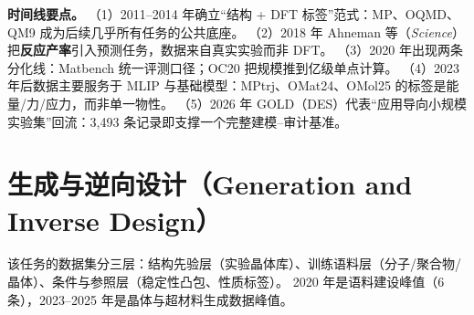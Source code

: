\documentclass[11pt,a4paper]{ctexart}
\begin{document}
\textbf{时间线要点。}
（1）2011--2014 年确立``结构 + DFT 标签''范式：MP、OQMD、QM9 成为后续几乎所有任务的公共底座。
（2）2018 年 Ahneman 等（\textit{Science}）把\textbf{反应产率}引入预测任务，数据来自真实实验而非 DFT。
（3）2020 年出现两条分化线：Matbench 统一评测口径；OC20 把规模推到亿级单点计算。
（4）2023 年后数据主要服务于 MLIP 与基础模型：MPtrj、OMat24、OMol25 的标签是能量/力/应力，而非单一物性。
（5）2026 年 GOLD（DES）代表``应用导向小规模实验集''回流：3,493 条记录即支撑一个完整建模--审计基准。

\section{生成与逆向设计（Generation and Inverse Design）}

该任务的数据集分三层：结构先验层（实验晶体库）、训练语料层（分子/聚合物/晶体）、条件与参照层（稳定性凸包、性质标签）。
2020 年是语料建设峰值（6 条），2023--2025 年是晶体与超材料生成数据峰值。
\end{document}
